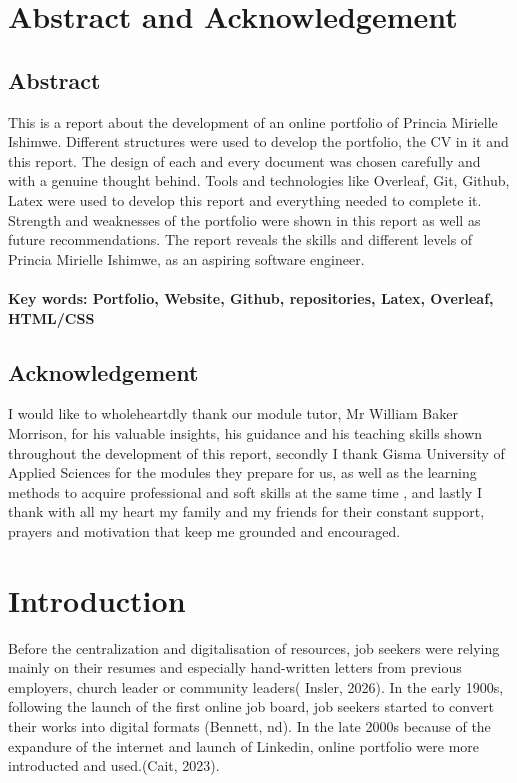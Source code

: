 \documentclass[12pt]{article}
\begin{document}
\section{Abstract and Acknowledgement}
\subsection{Abstract}

This is a report about the development of an online portfolio of Princia Mirielle Ishimwe. Different structures were used to develop the portfolio, the CV in it and this report. The design of each and every document was chosen carefully and with a genuine thought behind. Tools and technologies like Overleaf, Git, Github, Latex were used to develop this report and everything needed to complete it. Strength and weaknesses of the portfolio were shown in this report as well as future recommendations. The report reveals the skills and different levels of Princia Mirielle Ishimwe, as an aspiring software engineer.

\paragraph{Key words: Portfolio, Website, Github, repositories, Latex, Overleaf, HTML/CSS}


\subsection{Acknowledgement}

I would like to wholeheartdly thank our module tutor, Mr William Baker Morrison, for his valuable insights, his guidance and his teaching skills shown throughout the development of this report, secondly I thank Gisma University of Applied Sciences for the modules they prepare for us, as well as the learning methods to acquire professional and soft skills at the same time , and lastly I thank with all my heart my family and my friends for their constant support, prayers and motivation that keep me grounded and encouraged.

\newpage

\section {Introduction}

Before the centralization and digitalisation of resources, job seekers were relying mainly on their resumes and especially hand-written letters from previous employers, church leader or community leaders( Insler, 2026). In the early 1900s, following the launch of the first online job board, job seekers started to convert their works into digital formats (Bennett, nd). In the late 2000s because of the expandure of the internet and launch of Linkedin, online portfolio were more introducted and used.(Cait, 2023).
\end{document}

